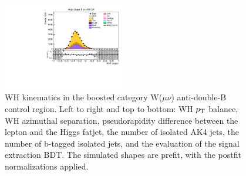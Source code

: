 \begin{figure}[tbp]
\begin{center}
    \includegraphics[width=0.48\textwidth]{figures/wlnhbb2016/boosted/WmnWHTT1bFJCR_bdtValue.pdf}
    \caption{WH kinematics in the boosted category W($\mu\nu$) anti-double-B control region.
    Left to right and top to bottom: WH $p_{\mathrm{T}}$ balance, WH azimuthal separation,
    pseudorapidity difference between the lepton and the Higgs fatjet,
    the number of isolated AK4 jets, the number of b-tagged isolated jets,
    and the evaluation of the signal extraction BDT.
    The simulated shapes are prefit, with the postfit normalizations applied.}
    \label{fig:boost_WmnTT1b_WH}
  \end{center}
\end{figure}
\clearpage

